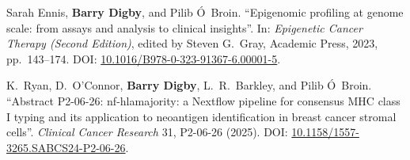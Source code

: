 \vspace{0.8cm}

\noindent Sarah Ennis, \textbf{Barry Digby}, and Pilib \'{O}~Broin. ``Epigenomic profiling at genome scale: from assays and analysis to clinical insights''. In: \textit{Epigenetic Cancer Therapy (Second Edition)}, edited by Steven G.~Gray, Academic Press, 2023, pp.~143--174. DOI: \href{https://doi.org/10.1016/B978-0-323-91367-6.00001-5}{10.1016/B978-0-323-91367-6.00001-5}.

\vspace{0.8cm}

\noindent K.~Ryan, D.~O'Connor, \textbf{Barry Digby}, L.~R.~Barkley, and Pilib \'{O}~Broin. ``Abstract P2-06-26: nf-hlamajority: a Nextflow pipeline for consensus MHC class I typing and its application to neoantigen identification in breast cancer stromal cells''. \textit{Clinical Cancer Research} 31, P2-06-26 (2025). DOI: \href{https://doi.org/10.1158/1557-3265.SABCS24-P2-06-26}{10.1158/1557-3265.SABCS24-P2-06-26}.


\newpage
